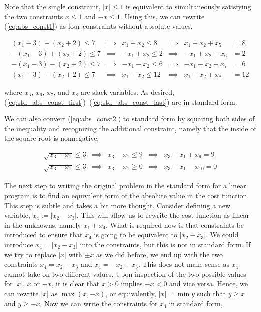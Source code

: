 \documentclass{article}
\begin{document}
Note that the single constraint, $|x| \le 1$ is equivalent to simultaneously satisfying the two constraints $x \le 1$ and $-x \le 1$.
Using this, we can rewrite (\ref{eq:abs_const1}) as four constraints without absolute values,

\begin{align} \label{eq:std_abs_const_first}
(x_1 - 3) + (x_2 + 2) \le 7 & \implies & x_1 + x_2 \le 8 & \implies & x_1 + x_2 + x_5 &= 8\\
-(x_1 - 3) + (x_2 + 2) \le 7 & \implies & -x_1 + x_2 \le 2 & \implies & -x_1 + x_2 + x_6 &= 2\\
-(x_1 - 3) - (x_2 + 2) \le 7 & \implies & -x_1 - x_2 \le 6 & \implies & -x_1 - x_2 + x_7 &= 6\\ \label{eq:std_abs_const_last}
(x_1 - 3) - (x_2 + 2) \le 7 & \implies & x_1 - x_2 \le 12 & \implies & x_1 - x_2 + x_8 &= 12
\end{align}

\noindent where $x_5$, $x_6$, $x_7$, and $x_8$ are slack variables. As desired, (\ref{eq:std_abs_const_first})--(\ref{eq:std_abs_const_last}) are in standard form. 

We can also convert (\ref{eq:abs_const2}) to standard form by squaring both sides of the inequality and recognizing the additional constraint, namely that the inside of the square root is nonnegative.

\begin{align} \label{eq:std_sqrt_const}
\sqrt{x_3 - x_1} \le 3 & \implies & x_3 - x_1 \le 9 & \implies & x_3 - x_1 + x_9 = 9\\
\sqrt{x_3 - x_1} \le 3 & \implies & x_3 - x_1 \ge 0 & \implies & x_3 - x_1 - x_{10} = 0
\end{align}

The next step to writing the original problem in the standard form for a linear program is to find an equivalent form of the absolute value in the cost function.
This step is subtle and takes a bit more thought.
Consider defining a new variable, $x_4 := |x_2 - x_3|$.
This will allow us to rewrite the cost function as linear in the unknowns, namely $x_1 + x_4$.
What is required now is that constraints be introduced to ensure that $x_4$ is going to be equivalent to $|x_2 - x_3|$.
We could introduce $x_4 = |x_2 - x_3|$ into the constraints, but this is not in standard form.
If we try to replace $|x|$ with $\pm x$ as we did before, we end up with the two constraints $x_4 = x_2 - x_3$ and $x_4 = -x_2 + x_3$.
This does not make sense as $x_4$ cannot take on two different values.
Upon inspection of the two possible values for $|x|$, $x$ or $-x$, it is clear that $x > 0$ implies $-x < 0$ and vice versa.
Hence, we can rewrite $|x|$ as $\max(x, -x)$, or equivalently, $|x| = \min y$ such that $y \ge x$ and $y \ge -x$.
Now we can write the constraints for $x_4$ in standard form,
\end{document}
